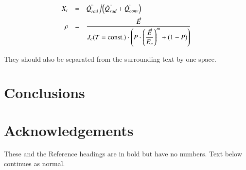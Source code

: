\documentclass[3p,times,procedia]{elsarticle}
\begin{document}
\begin{equation}
\begin{array}{rcl}
\displaystyle X_r &=& \displaystyle\dot{Q}^{"}_{rad}\left/\left(\dot{Q}^{"}_{rad} + \dot{Q}^{"}_{conv}\right)\right.\\[6pt]
\displaystyle \rho &=& \displaystyle\frac{\vec{E}}{J_c(T={\rm const.})\cdot\left(P\cdot\left(\displaystyle\frac{\vec{E}}{E_c}\right)^m+(1-P)\right)}
\end{array}
\end{equation}

They should also be separated from the surrounding text by one space.

\section{Conclusions}


\section*{Acknowledgements}

These and the Reference headings are in bold but have no numbers. Text below continues as normal.















\end{document}
